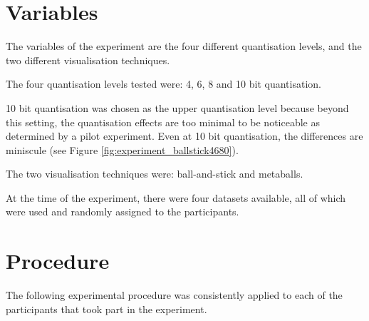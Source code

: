 
\section{Variables}
\label{sec:experiment_variables}

The variables of the experiment are the four different quantisation levels, and
the two different visualisation techniques.

The four quantisation levels tested were: 4, 6, 8 and 10 bit quantisation.

10 bit quantisation was chosen as the upper quantisation level because beyond
this setting, the quantisation effects are too minimal to be noticeable as
determined by a pilot experiment. Even at 10 bit quantisation, the differences
are miniscule (see Figure \ref{fig:experiment_ballstick4680}).

The two visualisation techniques were: ball-and-stick and metaballs.

At the time of the experiment, there were four datasets available, all of which
were used and randomly assigned to the participants.


\section{Procedure}
\label{sec:experiment_procedure}

The following experimental procedure was consistently applied to each of the
participants that took part in the experiment.

